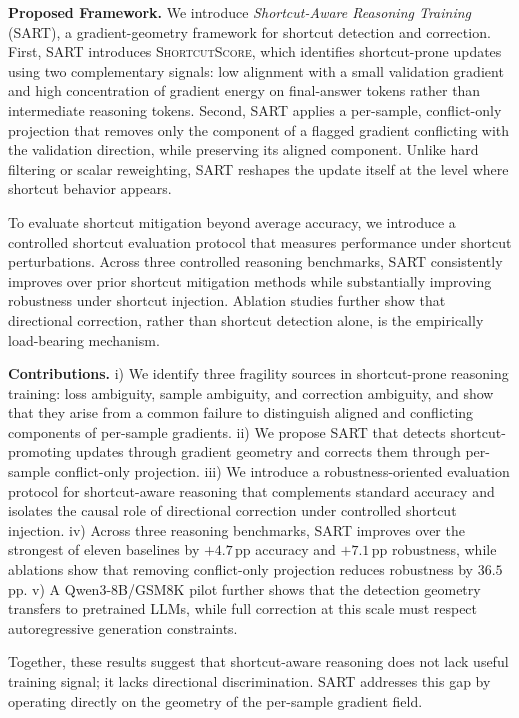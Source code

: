 \textbf{Proposed Framework.} We introduce \emph{Shortcut-Aware Reasoning Training} (SART), a gradient-geometry framework for shortcut detection and correction. First, SART introduces \textsc{ShortcutScore}, which identifies shortcut-prone updates using two complementary signals: low alignment with a small validation gradient and high concentration of gradient energy on final-answer tokens rather than intermediate reasoning tokens. Second, SART applies a per-sample, conflict-only projection that removes only the component of a flagged gradient conflicting with the validation direction, while preserving its aligned component. Unlike hard filtering or scalar reweighting, SART reshapes the update itself at the level where shortcut behavior appears.

To evaluate shortcut mitigation beyond average accuracy, we introduce a controlled shortcut evaluation protocol that measures performance under shortcut perturbations. Across three controlled reasoning benchmarks, SART consistently improves over prior shortcut mitigation methods while substantially improving robustness under shortcut injection. Ablation studies further show that directional correction, rather than shortcut detection alone, is the empirically load-bearing mechanism.

\textbf{Contributions.} i) We identify three fragility sources in shortcut-prone reasoning training: loss ambiguity, sample ambiguity, and correction ambiguity, and show that they arise from a common failure to distinguish aligned and conflicting components of per-sample gradients.
ii) We propose SART that detects shortcut-promoting updates through gradient geometry and corrects them through per-sample conflict-only projection.
iii) We introduce a robustness-oriented evaluation protocol for shortcut-aware reasoning that complements standard accuracy and isolates the causal role of directional correction under controlled shortcut injection.
iv) Across three reasoning benchmarks, SART improves over the strongest of eleven baselines by $+4.7$\,pp accuracy and $+7.1$\,pp robustness, while ablations show that removing conflict-only projection reduces robustness by $36.5$\,pp.
v) A Qwen3-8B/GSM8K pilot further shows that the detection geometry transfers to pretrained LLMs, while full correction at this scale must respect autoregressive generation constraints.

Together, these results suggest that shortcut-aware reasoning does not lack useful training signal; it lacks directional discrimination. SART addresses this gap by operating directly on the geometry of the per-sample gradient field.




